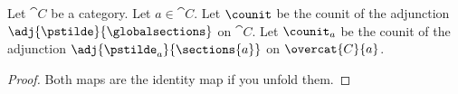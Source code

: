 Let $\cat{C}$ be a category.
Let $a\in \cat{C}$.
Let $\counit$ be the counit of the adjunction $\adj{\pstilde}{\globalsections}$ on $\cat{C}$.
Let $\counit_a$ be the counit of the adjunction $\adj{\pstilde_a}{\sections{a}}$ on $\overcat{C}{a}$.

\begin{proof}
Both maps are the identity map if you unfold them.
\end{proof}
